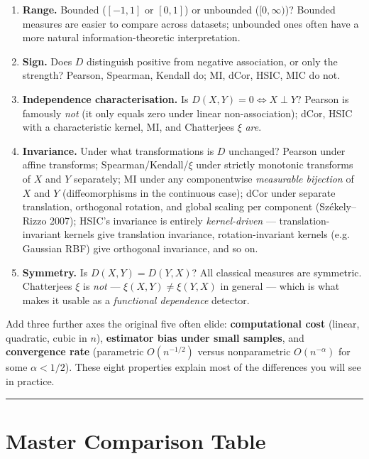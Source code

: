 \documentclass{article}
\providecommand{\tightlist}{\setlength{\itemsep}{0pt}\setlength{\parskip}{0pt}}
\let\oldsection\section
\renewcommand{\section}{\clearpage\oldsection}
\begin{document}
\begin{enumerate}
\def\labelenumi{\arabic{enumi}.}
\tightlist
\item
  \textbf{Range.} Bounded (\([-1, 1]\) or \([0, 1]\)) or unbounded
  (\([0, \infty)\))? Bounded measures are easier to compare across
  datasets; unbounded ones often have a more natural
  information-theoretic interpretation.
\item
  \textbf{Sign.} Does \(D\) distinguish positive from negative
  association, or only the strength? Pearson, Spearman, Kendall do; MI,
  dCor, HSIC, MIC do not.
\item
  \textbf{Independence characterisation.} Is
  \(D(X, Y) = 0 \iff X \perp Y\)? Pearson is famously \emph{not} (it
  only equals zero under linear non-association); dCor, HSIC with a
  characteristic kernel, MI, and Chatterjee\textquotesingle s \(\xi\)
  \emph{are}.
\item
  \textbf{Invariance.} Under what transformations is \(D\) unchanged?
  Pearson under affine transforms; Spearman/Kendall/\(\xi\) under
  strictly monotonic transforms of \(X\) and \(Y\) separately; MI under
  any componentwise \emph{measurable bijection} of \(X\) and \(Y\)
  (diffeomorphisms in the continuous case); dCor under separate
  translation, orthogonal rotation, and global scaling per component
  (Sz\'ekely--Rizzo 2007); HSIC's invariance is entirely \emph{kernel-driven}
  --- translation-invariant kernels give translation invariance, rotation-invariant
  kernels (e.g. Gaussian RBF) give orthogonal invariance, and so on.
\item
  \textbf{Symmetry.} Is \(D(X, Y) = D(Y, X)\)? All classical measures
  are symmetric. Chatterjee\textquotesingle s \(\xi\) is \emph{not} ---
  \(\xi(X, Y) \neq \xi(Y, X)\) in general --- which is what makes it
  usable as a \emph{functional dependence} detector.
\end{enumerate}

Add three further axes the original five often elide:
\textbf{computational cost} (linear, quadratic, cubic in \(n\)),
\textbf{estimator bias under small samples}, and \textbf{convergence
rate} (parametric \(O(n^{-1/2})\) versus nonparametric
\(O(n^{-\alpha})\) for some \(\alpha < 1/2\)). These eight properties
explain most of the differences you will see in practice.

\begin{center}\rule{0.5\linewidth}{0.5pt}\end{center}

\section{Master Comparison Table}\label{master-comparison-table}
\end{document}
